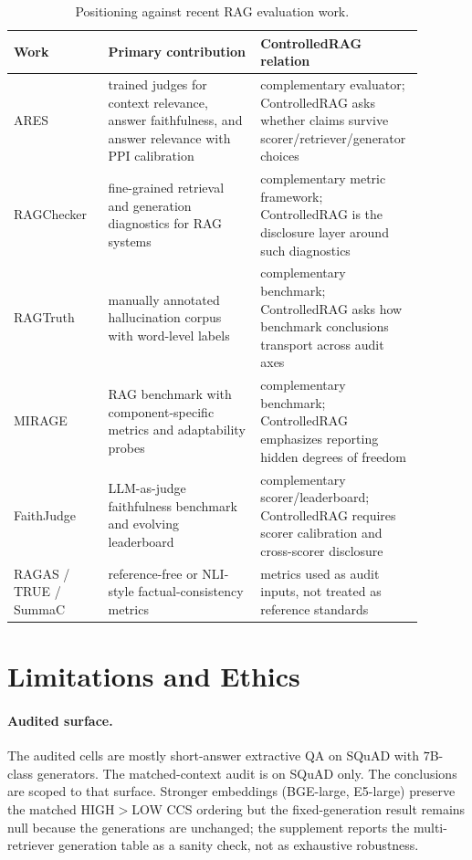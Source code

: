 \begin{table}[!htb]
\centering
\caption{Positioning against recent RAG evaluation work.}
\label{tab:related_positioning}
\scriptsize
\begin{tabular}{p{0.17\linewidth}p{0.36\linewidth}p{0.36\linewidth}}
\toprule
Work & Primary contribution & ControlledRAG relation \\
\midrule
ARES~\citep{saadfalcon2024ares} & trained judges for context relevance, answer faithfulness, and answer relevance with PPI calibration & complementary evaluator; ControlledRAG asks whether claims survive scorer/retriever/generator choices \\
RAGChecker~\citep{ru2024ragchecker} & fine-grained retrieval and generation diagnostics for RAG systems & complementary metric framework; ControlledRAG is the disclosure layer around such diagnostics \\
RAGTruth~\citep{niu2024ragtruth} & manually annotated hallucination corpus with word-level labels & complementary benchmark; ControlledRAG asks how benchmark conclusions transport across audit axes \\
MIRAGE~\citep{park2025mirage} & RAG benchmark with component-specific metrics and adaptability probes & complementary benchmark; ControlledRAG emphasizes reporting hidden degrees of freedom \\
FaithJudge~\citep{tamber2025faithjudge} & LLM-as-judge faithfulness benchmark and evolving leaderboard & complementary scorer/leaderboard; ControlledRAG requires scorer calibration and cross-scorer disclosure \\
RAGAS / TRUE / SummaC~\citep{es2024ragas,honovich2022true,laban2022summac} & reference-free or NLI-style factual-consistency metrics & metrics used as audit inputs, not treated as reference standards \\
\bottomrule
\end{tabular}
\end{table}

\section{Limitations and Ethics}
\label{sec:limits}

\paragraph{Audited surface.} The audited cells are mostly short-answer
extractive QA on SQuAD with $7$B-class generators. The matched-context
audit is on SQuAD only. The conclusions are scoped to that surface.
Stronger embeddings (BGE-large, E5-large) preserve the matched
HIGH$>$LOW CCS ordering but the fixed-generation result remains null
because the generations are unchanged; the supplement reports the
multi-retriever generation table as a sanity check, not as exhaustive
robustness.

